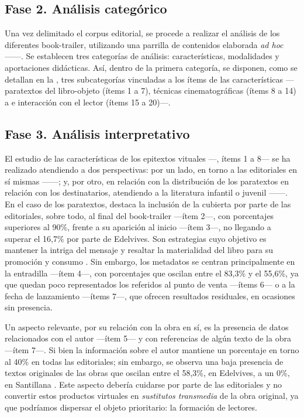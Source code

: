 \documentclass[spanish]{textolivre}
\begin{document}
\subsection{Fase 2. Análisis categórico}

Una vez delimitado el corpus editorial, se procede a realizar el análisis de los diferentes book-trailer, utilizando una parrilla de contenidos elaborada \emph{ad hoc} ——. Se establecen tres categorías de análisis: características, modalidades y aportaciones didácticas. Así, dentro de la primera categoría, se disponen, como se detallan en la , tres subcategorías vinculadas a los ítems de las características —paratextos del libro-objeto (ítems 1 a 7), técnicas cinematográficas (ítems 8 a 14) a e interacción con el lector (ítems 15 a 20)—.

\subsection{Fase 3. Análisis interpretativo}

El estudio de las características de los epitextos vituales —, ítems %
1 a 8— se ha realizado atendiendo a dos perspectivas: por un lado, en torno a las editoriales en sí mismas ——; y, por otro, en relación con la distribución de los paratextos en relación con los destinatarios, atendiendo a la literatura infantil o juvenil ——. En el caso de los paratextos, destaca la inclusión de la cubierta por parte de las editoriales, sobre todo, al final del book-trailer —ítem 2—, con porcentajes superiores al 90\%, frente a su aparición al inicio —ítem 3—, no llegando a superar el 16,7\% por parte de Edelvives. Son estrategias cuyo objetivo es mantener la intriga del mensaje y resaltar la materialidad del libro para su promoción y consumo \cite{garcia2013papel}. Sin embargo, los metadatos se centran principalmente en la entradilla —ítem 4—, con porcentajes que oscilan entre el 83,3\% y el 55,6\%, ya que quedan poco representados los referidos al punto de venta —ítems 6— o a la fecha de lanzamiento —ítems 7—, que ofrecen resultados residuales, en ocasiones sin presencia. 

Un aspecto relevante, por su relación con la obra en sí, es la presencia de datos relacionados con el autor —ítem 5— y con referencias de algún texto de la obra —ítem 7—. Si bien la información sobre el autor mantiene un porcentaje en torno al 40\% en todas las editoriales; sin embargo, se observa una baja presencia de textos originales de las obras que oscilan entre el 58,3\%, en Edelvives, a un 0\%, en Santillana \cite{lluch2003analisis}. Este aspecto debería cuidarse por parte de las editoriales y no convertir estos productos virtuales en \emph{sustitutos transmedia} de la obra original, ya que podríamos dispersar el objeto prioritario: la formación de lectores. 
\end{document}
